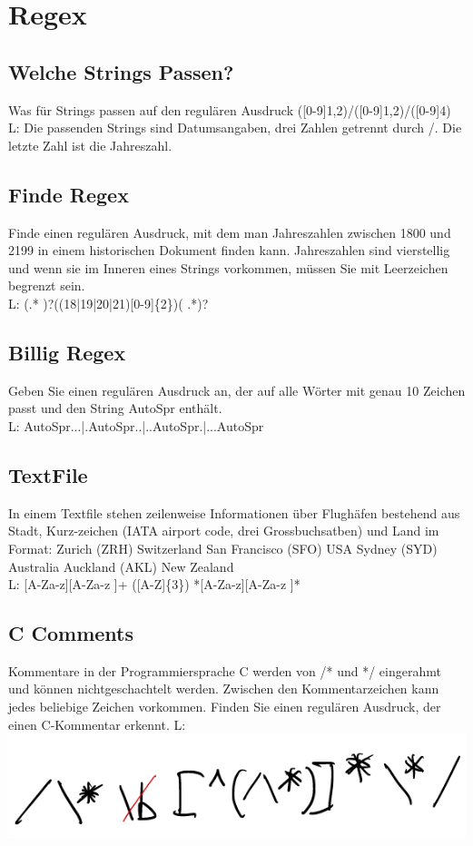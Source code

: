 \section{Regex}
\subsection{Welche Strings Passen?}
Was für Strings passen auf den regulären Ausdruck ([0-9]{1,2})/([0-9]{1,2})/([0-9]{4}) \\
L: Die passenden Strings sind Datumsangaben, drei Zahlen getrennt durch /. Die letzte
Zahl ist die Jahreszahl.
\subsection{Finde Regex}
Finde einen regulären Ausdruck, mit dem man Jahreszahlen zwischen 1800 und 2199 in einem historischen Dokument finden kann. Jahreszahlen sind vierstellig und wenn sie im Inneren eines Strings vorkommen, müssen Sie mit Leerzeichen begrenzt sein. \\
L: (.* )?((18|19|20|21)[0-9]\{2\})( .*)?

\subsection{Billig Regex}
Geben Sie einen regulären Ausdruck an, der auf alle Wörter mit genau 10 Zeichen passt und den String AutoSpr enthält. \\
L: AutoSpr...|.AutoSpr..|..AutoSpr.|...AutoSpr

\subsection{TextFile}
In einem Textfile stehen zeilenweise Informationen über Flughäfen bestehend aus Stadt, Kurz-zeichen (IATA airport code, drei Grossbuchsatben) und Land im Format:
Zurich (ZRH) Switzerland
San Francisco (SFO) USA
Sydney (SYD) Australia
Auckland (AKL) New Zealand \\
L: [A-Za-z][A-Za-z ]+ ([A-Z]\{3\}) *[A-Za-z][A-Za-z ]*
\subsection{C Comments}
Kommentare in der Programmiersprache C werden von /* und */ eingerahmt und können nichtgeschachtelt werden. Zwischen den Kommentarzeichen kann jedes beliebige Zeichen vorkommen. Finden Sie einen regulären Ausdruck, der einen C-Kommentar erkennt.
L: \includegraphics[width=\columnwidth]{img/cregex.png}

